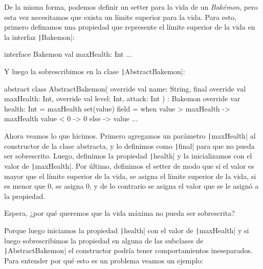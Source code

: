   De la misma forma, podemos definir un setter para la vida de un \textit{Bakémon}, pero esta vez
  necesitamos que exista un límite superior para la vida.
  Para esto, primero definamos una propiedad que represente el límite superior de la vida en la 
  interfaz \texttt|Bakemon|:

  \begin{kotlin}
    interface Bakemon {
      val maxHealth: Int
      ...
    }
  \end{kotlin}

  Y luego la sobrescribimos en la clase \texttt|AbstractBakemon|:

  \begin{kotlin}
    abstract class AbstractBakemon(
      override val name: String,
      final override val maxHealth: Int,
      override val level: Int,
      attack: Int
    ) : Bakemon {
      override var health: Int = maxHealth
        set(value) {
          field = when {
            value > maxHealth -> maxHealth
            value < 0 -> 0
            else -> value
          }
        }
      ...
    }
  \end{kotlin}

  Ahora veamos lo que hicimos.
  Primero agregamos un parámetro \texttt|maxHealth| al constructor de la clase 
  abstracta, y lo definimos como \texttt|final| para que no pueda ser sobrescrito.
  Luego, definimos la propiedad \texttt|health| y la inicializamos con el valor de
  \texttt|maxHealth|.
  Por último, definimos el setter de modo que si el valor es mayor que el límite superior de la
  vida, se asigna el límite superior de la vida, si es menor que 0, se asigna 0, y de lo contrario
  se asigna el valor que se le asignó a la propiedad.
  
  \begin{center}
    Espera, ¿por qué queremos que la vida máxima no pueda ser sobrescrita?
  \end{center}

  Porque luego iniciamos la propiedad \texttt|health| con el valor de
  \texttt|maxHealth| y si luego sobrescribimos la propiedad en alguna de las subclases
  de \texttt|AbstractBakemon| el constructor podría tener comportamientos ineseparados.
  Para entender por qué esto es un problema veamos un ejemplo:


